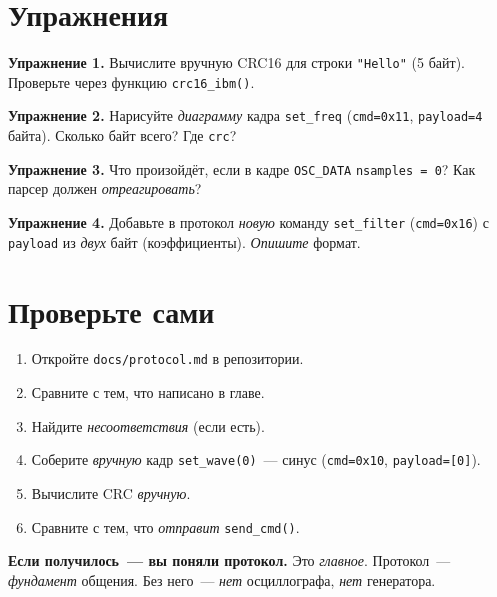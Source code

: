 \section{Упражнения}
\label{sec:protocol-exercises}

\begin{exercisebox}
\textbf{Упражнение 1.} Вычислите вручную CRC16 для строки
\texttt{"Hello"} (5 байт). Проверьте через функцию
\texttt{crc16\_ibm()}.
\end{exercisebox}

\begin{exercisebox}
\textbf{Упражнение 2.} Нарисуйте \emph{диаграмму} кадра
\texttt{set\_freq} (\texttt{cmd=0x11}, \texttt{payload=4} байта).
Сколько байт всего? Где \texttt{crc}?
\end{exercisebox}

\begin{exercisebox}
\textbf{Упражнение 3.} Что произойдёт, если в кадре
\texttt{OSC\_DATA} \texttt{nsamples = 0}? Как парсер
должен \emph{отреагировать}?
\end{exercisebox}

\begin{exercisebox}
\textbf{Упражнение 4.} Добавьте в протокол \emph{новую}
команду \texttt{set\_filter} (\texttt{cmd=0x16}) с
\texttt{payload} из \emph{двух} байт (коэффициенты).
\emph{Опишите} формат.
\end{exercisebox}

\section{Проверьте сами}
\label{sec:protocol-check}

\begin{enumerate}
    \item Откройте \texttt{docs/protocol.md} в репозитории.
    \item Сравните с тем, что написано в главе.
    \item Найдите \emph{несоответствия} (если есть).
    \item Соберите \emph{вручную} кадр \texttt{set\_wave(0)}~---
          синус (\texttt{cmd=0x10}, \texttt{payload=[0]}).
    \item Вычислите CRC \emph{вручную}.
    \item Сравните с тем, что \emph{отправит} \texttt{send\_cmd()}.
\end{enumerate}

\begin{ideabox}
\textbf{Если получилось~--- вы поняли протокол.} Это
\emph{главное}. Протокол~--- \emph{фундамент} общения.
Без него~--- \emph{нет} осциллографа, \emph{нет} генератора.
\end{ideabox}

